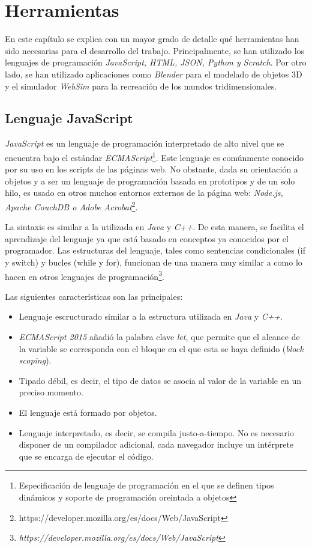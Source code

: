 \chapter{Herramientas}
\label{chap:herramientas} 
En este capítulo se explica con un mayor grado de detalle qué herramientas han sido necesarias para el desarrollo del trabajo. Principalmente, se han utilizado los lenguajes de programación \textit{JavaScript, HTML, JSON, Python y Scratch}. Por otro lado, se han utilizado aplicaciones como \textit{Blender} para el modelado de objetos 3D y el simulador \textit{WebSim} para la recreación de los mundos tridimensionales.
   
\section{Lenguaje JavaScript}
\textit{JavaScript} es un lenguaje de programación interpretado de alto nivel que se encuentra bajo el estándar \textit{ECMAScript}\footnote{Especificación de lenguaje de programación en el que se definen tipos dinámicos y soporte de programación oreintada a objetos}. Este lenguaje es comúnmente conocido por su uso en los scripts de las páginas web. No obstante, dada su orientación a objetos y a ser un lenguaje de programación basada en prototipos y de un solo hilo, es usado en otros muchos entornos externos de la página web: \textit{Node.js, Apache CouchDB o Adobe Acrobat}\footnote{https://developer.mozilla.org/es/docs/Web/JavaScript}. \newline

La sintaxis es similar a la utilizada en \textit{Java} y \textit{C++}. De esta manera, se facilita el aprendizaje del lenguaje ya que está basado en conceptos ya conocidos por el programador. Las estructuras del lenguaje, tales como sentencias condicionales (if y switch) y bucles (while y for), funcionan de una manera muy similar a como lo hacen en otros lenguajes de programación\footnote{\textit{https://developer.mozilla.org/es/docs/Web/JavaScript}}. \newline

Las siguientes características son las principales:
\begin{itemize}
    \item Lenguaje escructurado similar a la estructura utilizada en \textit{Java} y \textit{C++}.
    \item \textit{ECMAScript 2015} añadió la palabra clave \textit{let}, que permite que el alcance de la variable se corresponda con el bloque en el que esta se haya definido (\textit{block scoping}).
    \item Tipado débil, es decir, el tipo de datos se asocia al valor de la variable en un preciso momento.
    \item El lenguaje está formado por objetos.
    \item Lenguaje interpretado, es decir, se compila justo-a-tiempo. No es necesario disponer de un compilador adicional, cada navegador incluye un intérprete que se encarga de ejecutar el código.
\end{itemize}

